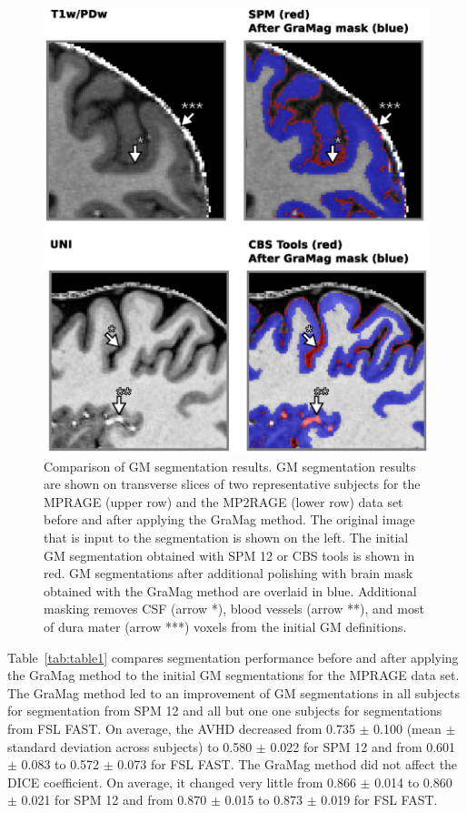 \begin{figure}[htb!]
\centering
\includegraphics[width=\textwidth]{figures/chapter_02/figure_4.eps}
\caption{Comparison of GM segmentation results. GM segmentation results are shown on transverse slices of two representative subjects for the MPRAGE (upper row) and the MP2RAGE (lower row) data set before and after applying the GraMag method. The original image that is input to the segmentation is shown on the left. The initial GM segmentation obtained with SPM 12 or CBS tools is shown in red. GM segmentations after additional polishing with brain mask obtained with the GraMag method are overlaid in blue. Additional masking removes CSF (arrow *), blood vessels (arrow **), and most of dura mater (arrow ***) voxels from the initial GM definitions.}
\label{fig:Fig4}
\end{figure}

Table~\ref{tab:table1} compares segmentation performance before and after applying the GraMag method to the initial GM segmentations for the MPRAGE data set. The GraMag method led to an improvement of GM segmentations in all subjects for segmentation from SPM 12 and all but one one subjects for segmentations from FSL FAST. On average, the AVHD decreased from 0.735 $\pm$ 0.100 (mean $\pm$ standard deviation across subjects) to 0.580 $\pm$ 0.022 for SPM 12 and from 0.601 $\pm$ 0.083 to 0.572 $\pm$ 0.073 for FSL FAST. The GraMag method did not affect the DICE coefficient. On average, it changed very little from 0.866 $\pm$ 0.014 to 0.860 $\pm$ 0.021 for SPM 12 and from 0.870 $\pm$ 0.015 to 0.873 $\pm$ 0.019 for FSL FAST.

